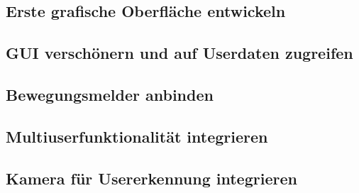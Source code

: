 \documentclass[11pt,a4paper]{article}
\begin{document}
\subsection{Erste grafische Oberfläche entwickeln}

\subsection{GUI verschönern und auf Userdaten zugreifen}

\subsection{Bewegungsmelder anbinden}

\subsection{Multiuserfunktionalität integrieren}

\subsection{Kamera für Usererkennung integrieren}
\end{document}
